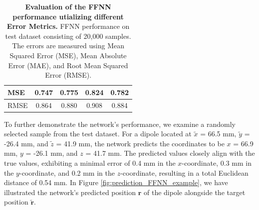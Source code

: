 \documentclass[a4paper, UKenglish, 11pt]{uiomaster}
\begin{document}
\begin{table}[!htb]
\begin{tabular}{l|cccc|}
\multicolumn{1}{|l|}{\cellcolor[HTML]{EFEFEF}MSE}  & \multicolumn{1}{c|}{0.747}                                                                                  & \multicolumn{1}{c|}{0.775}                                                                                   & \multicolumn{1}{c|}{0.824}                                                                                   & 0.782                                                                                                              \\ \hline
\multicolumn{1}{|l|}{\cellcolor[HTML]{EFEFEF}RMSE} & \multicolumn{1}{c|}{0.864}                                                                                  & \multicolumn{1}{c|}{0.880}                                                                                   & \multicolumn{1}{c|}{0.908}                                                                                   & 0.884                                                                                                              \\ \hline
\end{tabular}
\caption{\textbf{Evaluation of the FFNN performance utializing different Error Metrics.} \newline
FFNN performance on test dataset consisting of 20,000 samples. The errors are measured using Mean Squared Error (MSE), Mean Absolute Error (MAE), and Root Mean Squared Error (RMSE).}
\label{table:error_simple_dipole}
\end{table}

To further demonstrate the network's performance, we examine a randomly selected sample from the test dataset. For a dipole located at $\tilde{x}$ = 66.5 mm, $\tilde{y}$ = -26.4 mm, and $\tilde{z}$ = 41.9 mm, the network predicts the coordinates to be $x$ = 66.9 mm, $y$ = -26.1 mm, and $z$ = 41.7 mm. The predicted values closely align with the true values, exhibiting a minimal error of 0.4 mm in the $x$-coordinate, 0.3 mm in the $y$-coordinate, and 0.2 mm in the $z$-coordinate, resulting in a total Euclidean distance of 0.54 mm. In Figure \ref{fig:prediction_FFNN_example}, we have illustrated the network's predicted position $\mathbf{r}$ of the dipole alongside the target position $\mathbf{\tilde{r}}$.
\end{document}
